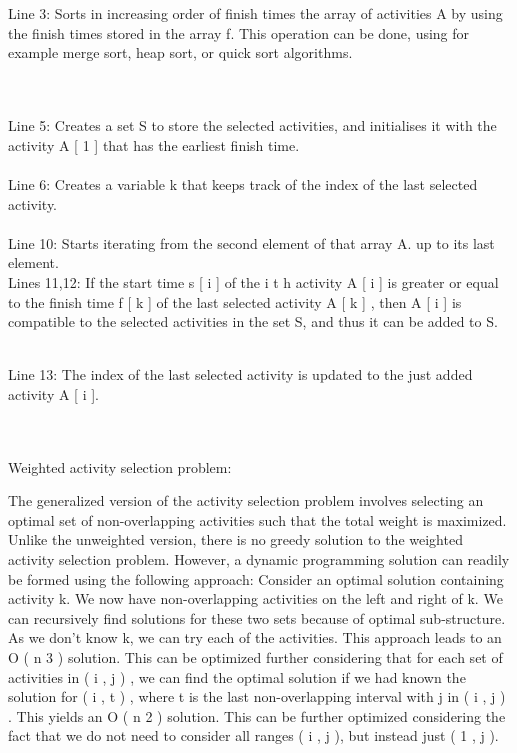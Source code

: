 \documentclass[14pt]{article}
\begin{document}
\\\vspace{3 mm}
\\ Line 3: Sorts in increasing order of finish times the array of activities A by using the finish times stored in the array f. This operation can be done, using for example merge sort, heap sort, or quick sort algorithms.

\\\vspace{2 mm}
\\Line 5: Creates a set S to store the selected activities, and initialises it with the activity 
A [ 1 ] that has the earliest finish time.
\\\vspace{1 mm}
\\Line 6: Creates a variable k 
 that keeps track of the index of the last selected activity.
\\\vspace{3 mm}
\\Line 10: Starts iterating from the second element of that array A.
 up to its last element.
\\\vspace{2 mm}
Lines 11,12: If the start time s [ i ]  of the 
i t h activity A [ i ] is greater or equal to the finish time f [ k ] of the last selected activity A [ k ] , then A [ i ] is compatible to the selected activities in the set S, and thus it can be added to S.  

\\\vspace{2mm}
Line 13: The index of the last selected activity is updated to the just added activity A [ i ].
\\\vspace{2mm}


\\\vspace{3 mm}
\\Weighted activity selection problem:

The generalized version of the activity selection problem involves selecting an optimal set of non-overlapping activities such that the total weight is maximized. Unlike the unweighted version, there is no greedy solution to the weighted activity selection problem. However, a dynamic programming solution can readily be formed using the following approach:
Consider an optimal solution containing activity k. We now have non-overlapping activities on the left and right of k. We can recursively find solutions for these two sets because of optimal sub-structure. As we don't know k, we can try each of the activities. This approach leads to an O ( n 3 ) solution. This can be optimized further considering that for each set of activities in 
( i , j ) , we can find the optimal solution if we had known the solution for ( i , t ) , where t is the last non-overlapping interval with j in ( i , j ) . This yields an O ( n 2 ) solution. This can be further optimized considering the fact that we do not need to consider all ranges ( i , j ), but instead just ( 1 , j ). 
\end{document}
